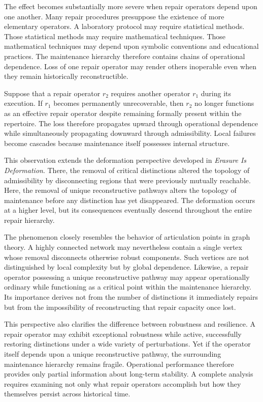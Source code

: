 \documentclass[12pt,oneside]{article}
\theoremstyle{plain}
\theoremstyle{definition}
\theoremstyle{remark}
\theoremstyle{plain}
\begin{document}
The effect becomes substantially more severe when repair operators depend upon one another. Many
repair procedures presuppose the existence of more elementary operators. A laboratory protocol may
require statistical methods. Those statistical methods may require mathematical techniques. Those
mathematical techniques may depend upon symbolic conventions and educational practices. The
maintenance hierarchy therefore contains chains of operational dependence. Loss of one repair
operator may render others inoperable even when they remain historically reconstructible.

Suppose that a repair operator $r_2$ requires another operator $r_1$ during its execution. If
$r_1$ becomes permanently unrecoverable, then $r_2$ no longer functions as an effective repair
operator despite remaining formally present within the repertoire. The loss therefore propagates
upward through operational dependence while simultaneously propagating downward through
admissibility. Local failures become cascades because maintenance itself possesses internal
structure.

This observation extends the deformation perspective developed in \emph{Erasure Is Deformation}.
There, the removal of critical distinctions altered the topology of admissibility by disconnecting
regions that were previously mutually reachable. Here, the removal of unique reconstructive
pathways alters the topology of maintenance before any distinction has yet disappeared. The
deformation occurs at a higher level, but its consequences eventually descend throughout the entire
repair hierarchy.

The phenomenon closely resembles the behavior of articulation points in graph theory. A highly
connected network may nevertheless contain a single vertex whose removal disconnects otherwise
robust components. Such vertices are not distinguished by local complexity but by global dependence.
Likewise, a repair operator possessing a unique reconstructive pathway may appear operationally
ordinary while functioning as a critical point within the maintenance hierarchy. Its importance
derives not from the number of distinctions it immediately repairs but from the impossibility of
reconstructing that repair capacity once lost.

This perspective also clarifies the difference between robustness and resilience. A repair operator
may exhibit exceptional robustness while active, successfully restoring distinctions under a wide
variety of perturbations. Yet if the operator itself depends upon a unique reconstructive pathway,
the surrounding maintenance hierarchy remains fragile. Operational performance therefore provides
only partial information about long-term stability. A complete analysis requires examining not only
what repair operators accomplish but how they themselves persist across historical time.
\end{document}
